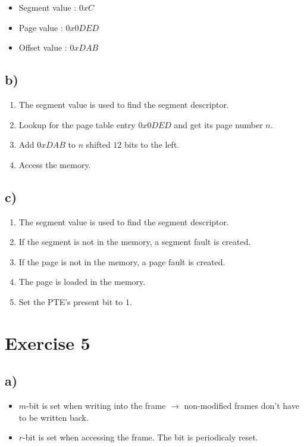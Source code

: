 \documentclass[a4paper,11pt]{report}
\begin{document}
\begin{itemize}
\item Segment value : $0xC$
\item Page value : $0x0DED$
\item Offset value : $0xDAB$
\end{itemize}

\subsection*{b)}

\begin{enumerate}
\item The segment value is used to find the segment descriptor.
\item Lookup for the page table entry $0x0DED$ and get its page number $n$.
\item Add $0xDAB$ to $n$ shifted $12$ bits to the left.
\item Access the memory.
\end{enumerate}

\subsection*{c)}

\begin{enumerate}
\item The segment value is used to find the segment descriptor.
\item If the segment is not in the memory, a segment fault is created.
\item If the page is not in the memory, a page fault is created.
\item The page is loaded in the memory.
\item Set the PTE's present bit to $1$.
\end{enumerate}

\section*{Exercise 5}

\subsection*{a)}

\begin{itemize}
\item $m$-bit is set when writing into the frame $\rightarrow$ non-modified
  frames don't have to be written back.
\item $r$-bit is set when accessing the frame. The bit is periodicaly reset.
\end{itemize}
\end{document}
